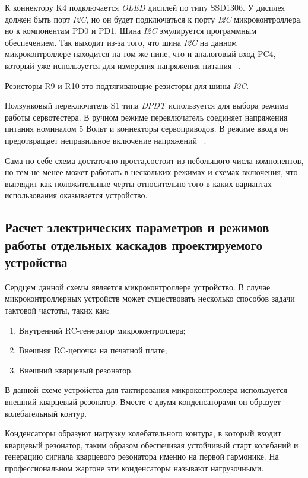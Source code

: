 К коннектору K4 подключается \textit{OLED} дисплей по типу SSD1306.  У
дисплея должен быть порт \textit{I2C}, но он будет подключаться к
порту \textit{I2C} микроконтроллера, но к компонентам PD0 и PD1. Шина
\textit{I2C} эмулируется программным обеспечением. Так выходит из-за
того, что шина \textit{I2C} на данном микроконтроллере находится на
том же пине, что и аналоговый вход PC4, который уже используется для
измерения напряжения питания ~\cite{Elector521}.

Резисторы R9 и R10 это подтягивающие резисторы для шины \textit{I2C}.

Ползунковый переключатель S1 типа \textit{DPDT} используется для
выбора режима работы сервотестера. В ручном режиме переключатель
соединяет напряжения питания номиналом 5 Вольт и коннекторы
сервоприводов. В режиме ввода он предотвращает неправильное включение
напряжений ~\cite{Elector521}.

Сама по себе схема достаточно проста,состоит из небольшого числа
компонентов, но тем не менее может работать в нескольких режимах и
схемах включения, что выглядит как положительные черты относительно
того в каких вариантах использования оказывается устройство.

\subsection{Расчет электрических параметров 
  и режимов работы 
  отдельных каскадов проектируемого устройства}


Сердцем данной схемы является микроконтроллере устройство.
В случае микроконтроллерных устройств может существовать несколько
способов задачи тактовой частоты, таких как:
\begin{enumerate}
\item Внутренний RC-генератор микроконтроллера;
\item Внешняя RC-цепочка на печатной плате;  
\item Внешний кварцевый резонатор.
\end{enumerate}

В данной схеме устройства для тактирования микроконтроллера
используется внешний кварцевый резонатор. Вместе с двумя
конденсаторами он образует колебательный контур.

Конденсаторы образуют нагрузку колебательного контура, в который
входит кварцевый резонатор, таким образом обеспечивая устойчивый старт
колебаний и генерацию сигнала кварцевого резонатора именно на первой
гармонике. На профессиональном жаргоне эти конденсаторы называют
нагрузочными.

